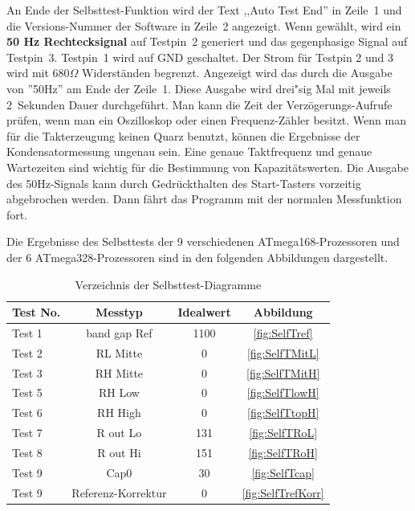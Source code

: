 An Ende der Selbsttest-Funktion wird der Text ,,Auto Test End'' in Zeile~1 und die Versions-Nummer der Software in Zeile~2 angezeigt.
Wenn gew\"ahlt, wird ein {\bf 50 Hz Rechtecksignal} auf Testpin~2 generiert und das gegenphasige Signal auf Testpin~3.
Testpin~1 wird auf GND geschaltet. Der Strom f\"ur Testpin 2 und 3 wird mit \(680\Omega\) Widerst\"anden begrenzt.
Angezeigt wird das durch die Ausgabe von ''50Hz'' am Ende der Zeile~1.
Diese Ausgabe wird drei"sig Mal mit jeweils 2~Sekunden Dauer durchgef\"uhrt.
Man kann die Zeit der Verz\"ogerungs-Aufrufe pr\"ufen, wenn man ein Oszilloskop oder einen
Frequenz-Z\"ahler besitzt.
Wenn man f\"ur die Takterzeugung keinen Quarz benutzt, k\"onnen die
Ergebnisse der Kondensatormessung ungenau sein.
Eine genaue Taktfrequenz und genaue Wartezeiten sind wichtig f\"ur die Bestimmung von Kapazit\"atswerten.
Die Ausgabe des 50Hz-Signals kann durch Gedr\"uckthalten des Start-Tasters vorzeitig abgebrochen werden.
Dann f\"ahrt das Programm mit der normalen Messfunktion fort.


Die Ergebnisse des Selbsttests der 9 verschiedenen ATmega168-Prozessoren und der 6 ATmega328-Prozessoren
sind in den folgenden Abbildungen dargestellt. 

\begin{table}[H]
  \begin{center}
    \begin{tabular}{| l | c | c | c |}
    \hline
Test No. &  Messtyp    & Idealwert & Abbildung \\
    \hline
    \hline
Test 1 & band gap Ref  & 1100 & \ref{fig:SelfTref} \\
    \hline
Test 2 & RL Mitte & 0 & \ref{fig:SelfTMitL} \\
    \hline
Test 3 & RH Mitte & 0 & \ref{fig:SelfTMitH} \\
    \hline
Test 5 & RH Low &  0 & \ref{fig:SelfTlowH} \\
    \hline
Test 6 & RH High & 0 & \ref{fig:SelfTtopH} \\
    \hline
Test 7 & R out Lo & 131 & \ref{fig:SelfTRoL} \\
    \hline
Test 8 & R out Hi & 151 & \ref{fig:SelfTRoH} \\
    \hline
Test 9 & Cap0  & 30 & \ref{fig:SelfTcap} \\
    \hline
Test 9 & Referenz-Korrektur  & 0 & \ref{fig:SelfTrefKorr} \\
    \hline
    \end{tabular}
  \end{center}
  \caption{Verzeichnis der Selbsttest-Diagramme}
  \label{tab:test_m168} 
\end{table}

